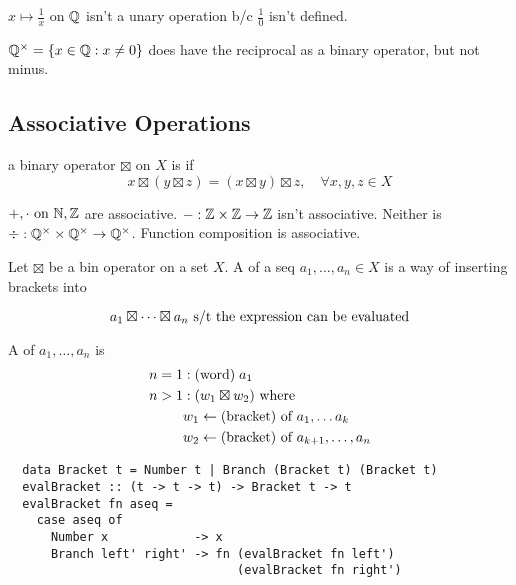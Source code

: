 \documentclass[12pt]{article}
\begin{document}
\bboxnote
\(x\mapsto\frac1x\) on \(\mathbb Q\) isn't a unary operation b/c \(\frac10\) isn't
defined.

\(\mathbb Q^\times=\{x\in\mathbb Q:x\neq 0\}\) does have the reciprocal as a binary operator,
but not minus.
\ebox

\subsection{Associative Operations}
\newcommand{\gop}[0]{\boxtimes}

\bbox
\begin{defn}
  a binary operator \(\gop\) on \(X\) is  if 
  \[x\gop(y\gop z)=(x\gop y)\gop z,\quad\forall x,y,z\in X\]
\end{defn}
\ebox

\bboxnote
\(+,\cdot\text{ on }\mathbb N,\mathbb Z\) are associative. \(-:\mathbb Z\times\mathbb Z\to\mathbb Z\) isn't
associative. Neither is \(\div:\mathbb Q^\times\times\mathbb Q^\times\to\mathbb Q^\times\). Function
composition is associative.
\ebox

\bbox
\begin{defn}
  Let \(\gop\) be a bin operator on a set \(X\). A  of a seq
  \(a_1,\dots,a_n\in X\) is a way of inserting brackets into
\end{defn}
\[a_1\gop\cdots\gop a_n\st\T{the expression can be evaluated}\]
\ebox


\bbox
\begin{defn}[Bracketing]
  A  of \(a_1,\dots,a_n\) is
  \begin{equation*}
    \begin{split}
      n=1 &:\TM{word}\;a_1\\
      n>1 &:(w_1\gop w_2)\T{ where}\\
          &w_1\is\TM{bracket}\T{ of }a_1,\dots a_k\\
          &w_2\is\TM{bracket}\T{ of }a_{k+1},\dots,a_n
    \end{split}
  \end{equation*}
\end{defn}
\ebox

\begin{tcolorbox}[colback=red!20!white,colframe=red]
  \begin{verbatim}
  data Bracket t = Number t | Branch (Bracket t) (Bracket t) 
  evalBracket :: (t -> t -> t) -> Bracket t -> t
  evalBracket fn aseq =
    case aseq of
      Number x            -> x
      Branch left' right' -> fn (evalBracket fn left')
                                (evalBracket fn right')\end{verbatim}
\end{tcolorbox}
\end{document}
